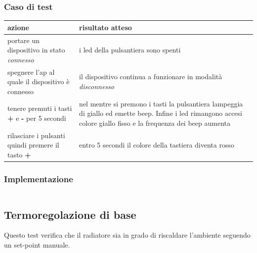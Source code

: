 \documentclass[12pt,a4paper,twoside,titlepage]{book}
\begin{document}
\subsubsection{Caso di test}
\begin{center}
\begin{tabular}{| p{} | p{} |}
    \hline
    \textbf{azione} & \textbf{risultato atteso} \\ \hline
    portare un dispositivo in stato \textit{connesso} & i \acrshort{led} della pulsantiera sono spenti \\ \hline
    spegnere l'\acrshort{ap} al quale il dispositivo è connesso & il dispositivo continua a funzionare in modalità \textit{disconnesso} \\ \hline
    tenere premuti i tasti \textbf{+} e \textbf{-} per 5 secondi & nel mentre si premono i tasti la pulsantiera lampeggia di giallo ed emette beep. Infine i \acrshort{led} rimangono accesi colore giallo fisso e la frequenza dei beep aumenta \\ \hline
    rilasciare i pulsanti quindi premere il tasto \textbf{+} & entro 5 secondi il colore della tastiera diventa rosso \\ \hline
\end{tabular}
\end{center}

\subsubsection{Implementazione}
\inputminted{python3}{src/test_factory_reset_unbounded.py}

\subsection{Termoregolazione di base}
\label{section:test_thermoregulation}

Questo test verifica che il radiatore sia in grado di riscaldare l'ambiente seguendo un set-point manuale.
\end{document}
